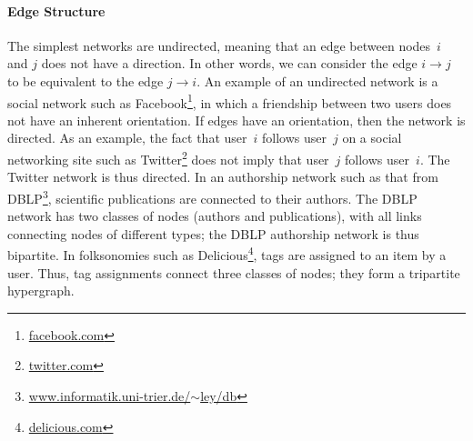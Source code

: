 \documentclass[11pt,a4paper]{book}
\begin{document}
\paragraph{Edge Structure}
The simplest networks are undirected, meaning that an edge between
nodes~$i$ and $j$ does not have a direction.  In other words, we can
consider the edge $i \rightarrow j$ to be equivalent to the edge $j
\rightarrow i$.  An example of an undirected network is a social network
such as Facebook\footnote{\href{http://facebook.com/}{facebook.com}}, in
which a friendship between two users does not have 
an inherent orientation. 
If edges have an orientation, 
then the network is directed.  As an example, the fact that
user~$i$ follows user~$j$ on a social networking site such as
Twitter\footnote{\href{http://twitter.com/}{twitter.com}} does 
not imply that user~$j$ follows 
user~$i$.  The Twitter network is thus directed.  In an authorship
network such as that from
DBLP\footnote{\href{http://www.informatik.uni-trier.de/~ley/db/}{www.informatik.uni-trier.de/$\sim$ley/db}},
scientific publications are connected to their authors.  The DBLP
network 
has two classes of nodes (authors and publications), with all links
connecting nodes of different 
types; the DBLP authorship network is thus bipartite. 
In folksonomies such as
Delicious\footnote{\href{http://delicious.com/}{delicious.com}}, 
tags are assigned to an item 
by a user.  Thus, tag assignments connect three classes of nodes; they
form a tripartite hypergraph.  
\end{document}
